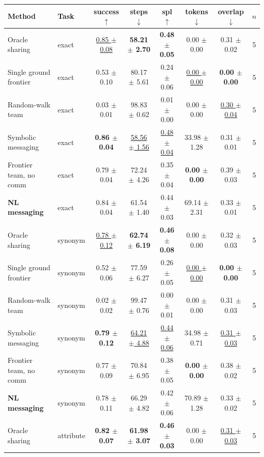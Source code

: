 \begin{tabular}{llcccccc}
\toprule
Method & Task & success $\uparrow$ & steps $\downarrow$ & spl $\uparrow$ & tokens $\downarrow$ & overlap $\downarrow$ & $n$ \\
\midrule
Oracle sharing & exact & \underline{0.85 $\pm$ 0.08} & \textbf{58.21 $\pm$ 2.70} & \textbf{0.48 $\pm$ 0.05} & 0.00 $\pm$ 0.00 & 0.31 $\pm$ 0.02 & 5 \\
Single ground frontier & exact & 0.53 $\pm$ 0.10 & 80.17 $\pm$ 5.61 & 0.24 $\pm$ 0.06 & \underline{0.00 $\pm$ 0.00} & \textbf{0.00 $\pm$ 0.00} & 5 \\
Random-walk team & exact & 0.03 $\pm$ 0.01 & 98.83 $\pm$ 0.62 & 0.01 $\pm$ 0.00 & 0.00 $\pm$ 0.00 & \underline{0.30 $\pm$ 0.04} & 5 \\
Symbolic messaging & exact & \textbf{0.86 $\pm$ 0.04} & \underline{58.56 $\pm$ 1.56} & \underline{0.48 $\pm$ 0.04} & 33.98 $\pm$ 1.28 & 0.31 $\pm$ 0.01 & 5 \\
Frontier team, no comm & exact & 0.79 $\pm$ 0.04 & 72.24 $\pm$ 4.26 & 0.35 $\pm$ 0.04 & \textbf{0.00 $\pm$ 0.00} & 0.39 $\pm$ 0.03 & 5 \\
\textbf{NL messaging} & exact & 0.84 $\pm$ 0.04 & 61.54 $\pm$ 1.40 & 0.44 $\pm$ 0.03 & 69.14 $\pm$ 2.31 & 0.33 $\pm$ 0.01 & 5 \\
\midrule
Oracle sharing & synonym & \underline{0.78 $\pm$ 0.12} & \textbf{62.74 $\pm$ 6.19} & \textbf{0.46 $\pm$ 0.08} & 0.00 $\pm$ 0.00 & 0.32 $\pm$ 0.03 & 5 \\
Single ground frontier & synonym & 0.52 $\pm$ 0.06 & 77.59 $\pm$ 6.27 & 0.26 $\pm$ 0.05 & \underline{0.00 $\pm$ 0.00} & \textbf{0.00 $\pm$ 0.00} & 5 \\
Random-walk team & synonym & 0.02 $\pm$ 0.02 & 99.47 $\pm$ 0.76 & 0.00 $\pm$ 0.01 & 0.00 $\pm$ 0.00 & 0.31 $\pm$ 0.03 & 5 \\
Symbolic messaging & synonym & \textbf{0.79 $\pm$ 0.12} & \underline{64.21 $\pm$ 4.88} & \underline{0.44 $\pm$ 0.06} & 34.98 $\pm$ 0.71 & \underline{0.31 $\pm$ 0.03} & 5 \\
Frontier team, no comm & synonym & 0.77 $\pm$ 0.09 & 70.84 $\pm$ 6.95 & 0.38 $\pm$ 0.05 & \textbf{0.00 $\pm$ 0.00} & 0.38 $\pm$ 0.02 & 5 \\
\textbf{NL messaging} & synonym & 0.78 $\pm$ 0.11 & 66.29 $\pm$ 4.82 & 0.42 $\pm$ 0.06 & 70.89 $\pm$ 1.28 & 0.33 $\pm$ 0.02 & 5 \\
\midrule
Oracle sharing & attribute & \textbf{0.82 $\pm$ 0.07} & \textbf{61.98 $\pm$ 3.07} & \textbf{0.46 $\pm$ 0.03} & 0.00 $\pm$ 0.00 & \underline{0.31 $\pm$ 0.03} & 5 \\

\end{tabular}
